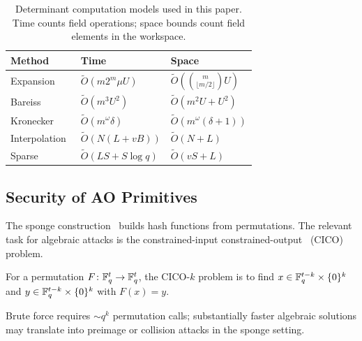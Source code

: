 \begin{table}[t]
	\centering
	\small
	\caption{Determinant computation models used in this paper. Time counts field operations; space bounds count field elements in the workspace.}
	\label{tab:determinant_methods}
	\setlength{\tabcolsep}{4pt}
	\renewcommand{\arraystretch}{1.05}
	\begin{tabular}{p{}p{}p{}}
		\toprule
		\textbf{Method} & \textbf{Time} & \textbf{Space} \\
		\midrule
		Expansion~\cite{GentlemanJohnson1976,HorowitzSahni1975} & $\widetilde{O}(m2^m \mu U)$ & $\widetilde{O}\!\left(\binom{m}{\lfloor m/2\rfloor}U\right)$ \\
		Bareiss~\cite{Bareiss1968,GentlemanJohnson1976} & $\widetilde{O}(m^3U^2)$ & $\widetilde{O}(m^2U+U^2)$ \\
		Kronecker~\cite{Li2007symbolic} & $\widetilde{O}(m^{\omega}\delta)$ & $\widetilde{O}(m^\omega(\delta+1))$ \\
		Interpolation~\cite{HorowitzSahni1975} & $\widetilde{O}\!\left(N(L+vB)\right)$ & $\widetilde{O}(N+L)$ \\
		Sparse~\cite{DBLP:journals/jsc/Huang23}\footnotemark & $\widetilde{O}(LS + S\log q)$ & $\widetilde{O}(vS+L)$ \\
		\bottomrule
	\end{tabular}
\end{table}

\subsection{Security of AO Primitives}
The sponge construction~\cite{DBLP:conf/eurocrypt/BertoniDPA08} builds hash functions from permutations. The relevant task for algebraic attacks is the constrained-input constrained-output~\cite{bertoni2007sponge} (CICO) problem.

\begin{definition}
	For a permutation $F\colon \mathbb{F}_q^t \to \mathbb{F}_q^t$, the CICO-$k$ problem is to find $x \in \mathbb{F}_q^{t-k} \times \{0\}^{k}$ and $y \in \mathbb{F}_q^{t-k} \times \{0\}^{k}$ with $F(x) = y$.
\end{definition}

Brute force requires $\sim q^k$ permutation calls; substantially faster algebraic solutions may translate into preimage or collision attacks in the sponge setting.
